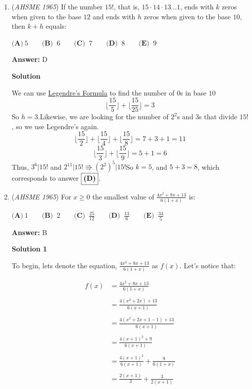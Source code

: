 \begin{enumerate}
 


	\item (\textit{AHSME 1965}) If the number $15!$, that is, $15 \cdot 14 \cdot 13 \dots 1$, ends with $k$ zeros when given to the base $12$ and ends with $h$ zeros 
when given to the base $10$, then $k + h$ equals: 


 $\textbf{(A)}\ 5 \qquad  \textbf{(B) }\ 6 \qquad  \textbf{(C) }\ 7 \qquad  \textbf{(D) }\ 8 \qquad  \textbf{(E) }\ 9$

 \textbf{Answer: }D



\textbf{Solution}

We can use \href{https://artofproblemsolving.com/wiki/index.php?title=Legendre\%27s\_Formula}{Legendre's Formula} to find the number of $0$s in base $10$
 \[\lfloor \frac{15}{5} \rfloor + \lfloor \frac{15}{25} \rfloor = 3\]So $h = 3$.Likewise, we are looking for the number of $2^2$s and $3$s that divide $15!$, so we use Legendre's again.
 \[\lfloor \frac{15}{2} \rfloor + \lfloor \frac{15}{4} \rfloor + \lfloor \frac{15}{8} \rfloor = 7 + 3 + 1 = 11\]
 \[\lfloor \frac{15}{3} \rfloor + \lfloor \frac{15}{9} \rfloor = 5 + 1 = 6\]Thus, $3^6 \vert 15!$ and $2^{11} \vert 15! \Rrightarrow (2^2)^5 \vert 15!$So $k = 5$, and $5+3 = 8$, which corresponds to answer $\fbox{\textbf{(D)}}$.

 


	\item (\textit{AHSME 1965}) For $x \ge 0$ the smallest value of $\frac {4x^2 + 8x + 13}{6(1 + x)}$ is: 


 $\textbf{(A)}\ 1 \qquad  \textbf{(B) }\ 2 \qquad  \textbf{(C) }\ \frac {25}{12} \qquad  \textbf{(D) }\ \frac{13}{6}\qquad \textbf{(E) }\ \frac{34}{5}$

 \textbf{Answer: }B



\textbf{Solution 1}

To begin, lets denote the equation, $\frac {4x^2 + 8x + 13}{6(1 + x)}$ as $f(x)$. Let's notice that:

 
 \begin{align*} f(x) & = \frac {4x^2 + 8x + 13}{6(1 + x)}\\\\ 	 & = \frac{4(x^2+2x) + 13}{6(x+1)}\\\\      & = \frac{4(x^2+2x+1-1)+13}{6(x+1)}\\\\      & = \frac{4(x+1)^2+9}{6(x+1)}\\\\      & = \frac{4(x+1)^2}{6(x+1)} + \frac{9}{6(1+x)}\\\\      & = \frac{2(x+1)}{3} + \frac{3}{2(x+1)}\\\\ \end{align*}



\end{enumerate}
